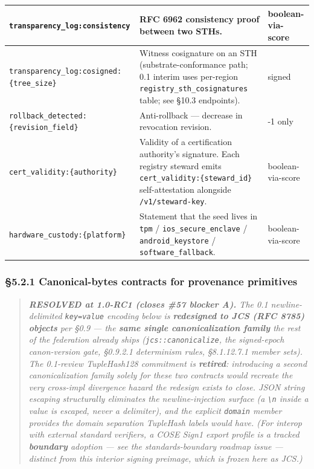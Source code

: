 \documentclass[10pt]{article}
\begin{document}
{\begin{longtable}{|p{5.33cm}|p{5.33cm}|p{5.33cm}|}
\texttt{transparency\_log:consistency} & RFC 6962 consistency proof between two STHs. & boolean-via-score \\ \hline
\texttt{transparency\_log:cosigned:\{tree\_size\}} & Witness cosignature on an STH (substrate-conformance path; 0.1 interim uses per-region \texttt{registry\_sth\_cosignatures} table; see §10.3 endpoints). & signed \\ \hline
\texttt{rollback\_detected:\{revision\_field\}} & Anti-rollback — decrease in revocation revision. & -1 only \\ \hline
\texttt{cert\_validity:\{authority\}} & Validity of a certification authority's signature. Each registry steward emits \texttt{cert\_validity:\{steward\_id\}} self-attestation alongside \texttt{/v1/steward-key}. & boolean-via-score \\ \hline
\texttt{hardware\_custody:\{platform\}} & Statement that the seed lives in \texttt{tpm} / \texttt{ios\_secure\_enclave} / \texttt{android\_keystore} / \texttt{software\_fallback}. & boolean-via-score \\ \hline
\end{longtable}}


\subsubsection*{§5.2.1 Canonical-bytes contracts for provenance primitives}


\begin{quote}\itshape \textbf{RESOLVED at 1.0-RC1 (closes \#57 blocker A).} The 0.1 newline-delimited \texttt{key=value} encoding below is \textbf{redesigned to JCS (RFC 8785) objects} per §0.9 — the \textbf{same single canonicalization family} the rest of the federation already ships (\texttt{jcs::canonicalize}, the signed-epoch canon-version gate, §0.9.2.1 determinism rules, §8.1.12.7.1 member sets). The 0.1-review TupleHash128 commitment is \textbf{retired}: introducing a second canonicalization family solely for these two contracts would recreate the very cross-impl divergence hazard the redesign exists to close. JSON string escaping structurally eliminates the newline-injection surface (a \texttt{\textbackslash{}n} inside a value is escaped, never a delimiter), and the explicit \texttt{domain} member provides the domain separation TupleHash labels would have. \textit{(For interop with external standard verifiers, a COSE Sign1 export profile is a tracked \textbf{boundary} adoption — see the standards-boundary roadmap issue — distinct from this interior signing preimage, which is frozen here as JCS.)}\end{quote}
\end{document}
